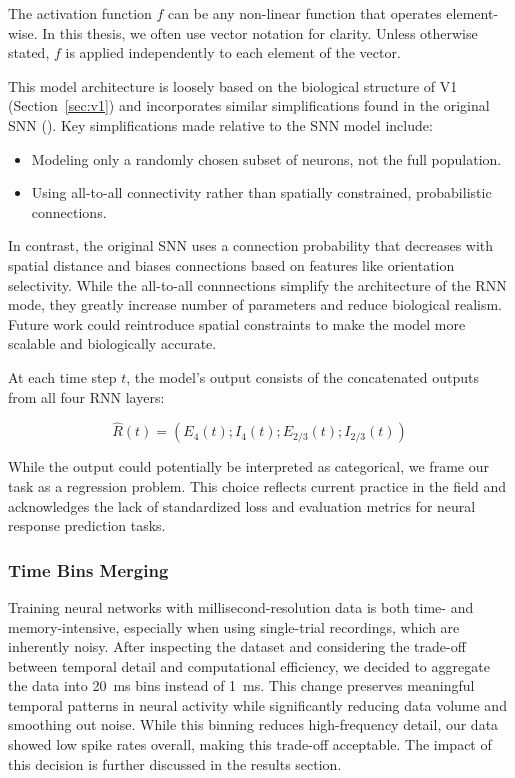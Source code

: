 The activation function $f$ can be any non-linear function that operates element-wise. In this thesis, we often use vector notation for clarity. Unless otherwise stated, $f$ is applied independently to each element of the vector.

This model architecture is loosely based on the biological structure of V1 (Section~\ref{sec:v1}) and incorporates similar simplifications found in the original SNN (\citet{antolik2024comprehensive}). Key simplifications made relative to the SNN model include:
\begin{itemize}
    \item Modeling only a randomly chosen subset of neurons, not the full population.
    \item Using all-to-all connectivity rather than spatially constrained, probabilistic connections.
\end{itemize}

In contrast, the original SNN uses a connection probability that decreases with spatial distance and biases connections based on features like orientation selectivity. While the all-to-all connnections simplify the architecture of the RNN mode, they greatly increase number of parameters and reduce biological realism. Future work could reintroduce spatial constraints to make the model more scalable and biologically accurate.

At each time step $t$, the model's output consists of the concatenated outputs from all four RNN layers:

$$\hat{R}(t) = (E_4(t); I_4(t); E_{2/3}(t); I_{2/3}(t))$$

While the output could potentially be interpreted as categorical, we frame our task as a regression problem. This choice reflects current practice in the field and acknowledges the lack of standardized loss and evaluation metrics for neural response prediction tasks.

\subsubsection{Time Bins Merging}
\label{subsubsec:time_bins_merging}

Training neural networks with millisecond-resolution data is both time- and memory-intensive, especially when using single-trial recordings, which are inherently noisy. After inspecting the dataset and considering the trade-off between temporal detail and computational efficiency, we decided to aggregate the data into 20~ms bins instead of 1~ms. This change preserves meaningful temporal patterns in neural activity while significantly reducing data volume and smoothing out noise. While this binning reduces high-frequency detail, our data showed low spike rates overall, making this trade-off acceptable. The impact of this decision is further discussed in the results section.

